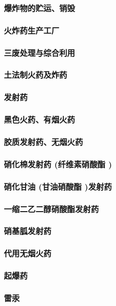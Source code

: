 \documentclass[UTF8]{../../ApplicationUniverse}
\begin{document}
        \subsubsection{爆炸物的贮运、销毁}
    \subsubsection{火炸药生产工厂}
    \subsubsection{三废处理与综合利用}
\subsubsection{土法制火药及炸药}
\subsubsection{发射药}
    \subsubsection{黑色火药、有烟火药}
    \subsubsection{胶质发射药、无烟火药}
        \subsubsection{硝化棉发射药 (纤维素硝酸酯 )}
        \subsubsection{硝化甘油 (甘油硝酸酯 )发射药}
        \subsubsection{一缩二乙二醇硝酸酯发射药}
        \subsubsection{硝基胍发射药}
        \subsubsection{代用无烟火药}
\subsubsection{起爆药}
    \subsubsection{雷汞}
\end{document}
